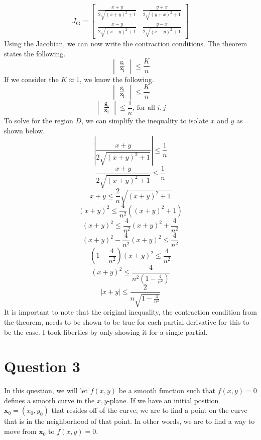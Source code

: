 \documentclass{article}
\begin{document}
\[
J_\mathbf{G} = \begin{bmatrix}
    \frac{x + y}{2 \sqrt{\left(x + y\right)^{2} + 1}} & \frac{y + x}{2 \sqrt{\left(y + x\right)^{2} + 1}}\\
    \frac{x - y}{2 \sqrt{\left(x - y\right)^{2} + 1}} & \frac{y - x}{2 \sqrt{\left(x - y\right)^{2} + 1}}
\end{bmatrix}
\]
Using the Jacobian, we can now write the contraction conditions. The theorem states the following.
\[
\begin{vmatrix}
    \frac{\mathbf{g}_i}{\mathbf{x_j}}
\end{vmatrix}
\leq \frac{K}{n}
\]
If we consider the \(K \approx 1\), we know the following.
\[
\begin{vmatrix}
    \frac{\mathbf{g}_i}{\mathbf{x_j}}
\end{vmatrix}
\leq \frac{K}{n}
\]
\[
\begin{vmatrix}
    \frac{\mathbf{g}_i}{\mathbf{x_j}}
\end{vmatrix}
\leq \frac{1}{n} \mbox{, for all }i,j
\]
To solve for the region \(D\), we can simplify the inequality to isolate \(x\) and \(y\) as shown below.
\[
\left| \frac{x + y}{2 \sqrt{(x + y)^2 + 1}} \right| \leq \frac{1}{n}
\]
\[
\frac{x + y}{2 \sqrt{(x + y)^2 + 1}} \leq \frac{1}{n}
\]
\[
x + y \leq \frac{2}{n} \sqrt{(x + y)^2 + 1}
\]
\[
(x + y)^2 \leq \frac{4}{n^2} ((x + y)^2 + 1)
\]
\[
(x + y)^2 \leq \frac{4}{n^2} (x + y)^2 + \frac{4}{n^2}
\]
\[
(x + y)^2 - \frac{4}{n^2} (x + y)^2 \leq \frac{4}{n^2}
\]
\[
\left( 1 - \frac{4}{n^2} \right) (x + y)^2 \leq \frac{4}{n^2}
\]
\[
(x + y)^2 \leq \frac{4}{n^2 \left( 1 - \frac{4}{n^2} \right)}
\]
\[
|x + y| \leq \frac{2}{n \sqrt{1 - \frac{4}{n^2}}}
\]
It is important to note that the original inequality, the contraction condition from the theorem, needs to be shown to be true for each partial derivative for this to be the case. I took liberties by only showing it for a single partial.

\section{Question 3}
In this question, we will let \(f(x,y)\) be a smooth function such that \(f(x,y)=0\) defines a smooth curve in the \(x,y\)-plane. If we have an initial position \(\mathbf{x}_0 = (x_0,y_0)\) that resides off of the curve, we are to find a point on the curve that is in the neighborhood of that point. In other words, we are to find a way to move from \(\mathbf{x}_0\) to \(f(x,y)=0\).
\end{document}
